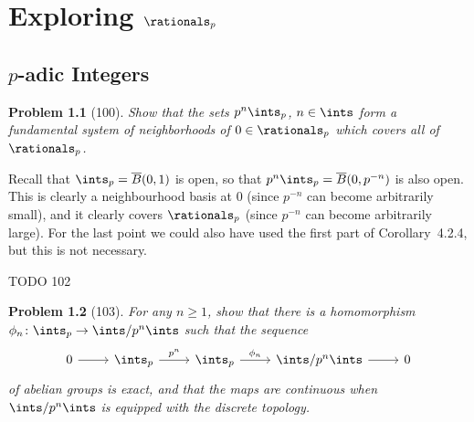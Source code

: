 \documentclass[a4paper, 11pt]{memoir}
\theoremstyle{plaincustomnumber}
\newtheorem{problem}{Problem}
\theoremstyle{changedotbreakcustomnumber}
\begin{document}
\chapter{Exploring $\rationals_p$}

\addtocounter{section}{1}
\section{$p$-adic Integers}

\begin{problem}[100]
    Show that the sets $p^n \ints_p$, $n \in \ints$ form a fundamental system of neighborhoods of $0 \in \rationals_p$ which covers all of $\rationals_p$.
\end{problem}

\begin{solution}
    Recall that $\ints_p = \overline{B}(0,1)$ is open, so that $p^n \ints_p = \overline{B}(0,p^{-n})$ is also open. This is clearly a neighbourhood basis at $0$ (since $p^{-n}$ can become arbitrarily small), and it clearly covers $\rationals_p$ (since $p^{-n}$ can become arbitrarily large). For the last point we could also have used the first part of Corollary~4.2.4, but this is not necessary.
\end{solution}

TODO 102

\begin{problem}[103]
    For any $n \geq 1$, show that there is a homomorphism $\phi_n \colon \ints_p \to \ints / p^n \ints$ such that the sequence
    \begin{equation*}
        \begin{tikzcd}
            0
                \ar[r]
            & \ints_p
                \ar[r, "p^n"]
            & \ints_p
                \ar[r, "\phi_n"]
            & \ints/p^n \ints
                \ar[r]
            & 0
        \end{tikzcd}
    \end{equation*}
    of abelian groups is exact, and that the maps are continuous when $\ints / p^n \ints$ is equipped with the discrete topology.
\end{problem}
\end{document}
